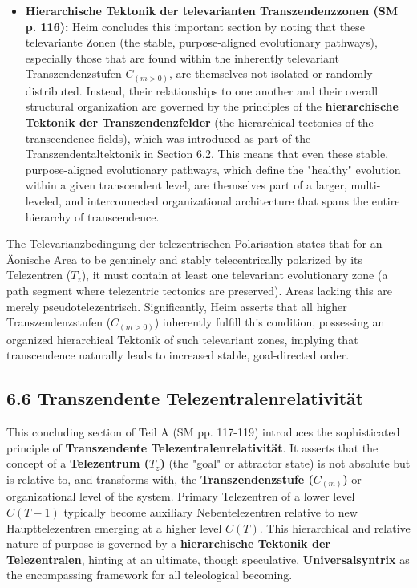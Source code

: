 \documentclass[12pt]{article}
\newcommand{\telezentrum}{T_z}
\begin{document}
\begin{itemize}
    \item \textbf{Hierarchische Tektonik der televarianten Transzendenzzonen (SM p. 116):}
    Heim concludes this important section by noting that these televariante Zonen (the stable, purpose-aligned evolutionary pathways), especially those that are found within the inherently televariant Transzendenzstufen \( C_{(m>0)} \), are themselves not isolated or randomly distributed. Instead, their relationships to one another and their overall structural organization are governed by the principles of the \textbf{hierarchische Tektonik der Transzendenzfelder} (the hierarchical tectonics of the transcendence fields), which was introduced as part of the Transzendentaltektonik in Section 6.2. This means that even these stable, purpose-aligned evolutionary pathways, which define the "healthy" evolution within a given transcendent level, are themselves part of a larger, multi-leveled, and interconnected organizational architecture that spans the entire hierarchy of transcendence.
\end{itemize}

The Televarianzbedingung der telezentrischen Polarisation states that for an Äonische Area to be genuinely and stably telecentrically polarized by its Telezentren (\(\telezentrum\)), it must contain at least one televariant evolutionary zone (a path segment where telezentric tectonics are preserved). Areas lacking this are merely pseudotelezentrisch. Significantly, Heim asserts that all higher Transzendenzstufen (\(C_{(m>0)}\)) inherently fulfill this condition, possessing an organized hierarchical Tektonik of such televariant zones, implying that transcendence naturally leads to increased stable, goal-directed order.

\subsection{6.6 Transzendente Telezentralenrelativität}
\label{sec:telezentralenrelativitaet}

This concluding section of Teil A (SM pp. 117-119) introduces the sophisticated principle of \textbf{Transzendente Telezentralenrelativität}. It asserts that the concept of a \textbf{Telezentrum (\(\telezentrum\))} (the "goal" or attractor state) is not absolute but is relative to, and transforms with, the \textbf{Transzendenzstufe (\(C_{(m)}\))} or organizational level of the system. Primary Telezentren of a lower level \(C(T-1)\) typically become auxiliary Nebentelezentren relative to new Haupttelezentren emerging at a higher level \(C(T)\). This hierarchical and relative nature of purpose is governed by a \textbf{hierarchische Tektonik der Telezentralen}, hinting at an ultimate, though speculative, \textbf{Universalsyntrix} as the encompassing framework for all teleological becoming.
\end{document}
